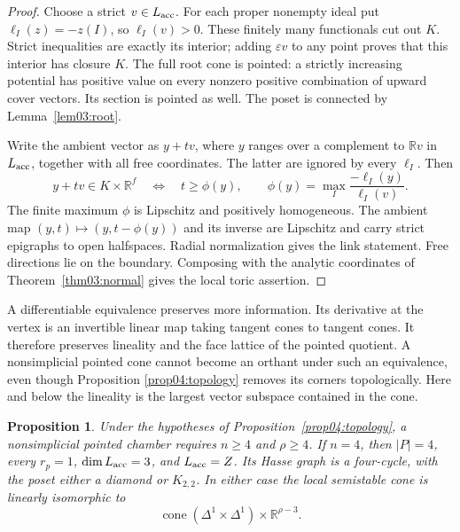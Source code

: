 \documentclass[11pt]{amsart}
\newtheorem{proposition}[theorem]{Proposition}
\theoremstyle{definition}
\theoremstyle{remark}
\newcommand{\RR}{\mathbb R}
\newcommand{\cone}{\operatorname{cone}}
\begin{document}
\begin{proof}
Choose a strict \(v\in L_{\rm acc}\). For each proper nonempty
ideal put \(\ell_I(z)=-z(I)\), so \(\ell_I(v)>0\).
These finitely many functionals cut out \(K\). Strict inequalities
are exactly its interior; adding \(\varepsilon v\) to any point
proves that this interior has closure \(K\). The full root cone is
pointed: a strictly increasing potential has positive value on every
nonzero positive combination of upward cover vectors. Its section is
pointed as well. The poset is connected by Lemma~\ref{lem03:root}.

Write the ambient vector as \(y+tv\), where \(y\) ranges over a
complement to \(\RR v\) in \(L_{\rm acc}\), together with all
free coordinates. The latter are ignored by every \(\ell_I\).
Then
\[
 y+tv\in K\times\RR^f
 \quad\Longleftrightarrow\quad
 t\ge\phi(y),\qquad
 \phi(y)=\max_I\frac{-\ell_I(y)}{\ell_I(v)}.
\]
The finite maximum \(\phi\) is Lipschitz and positively homogeneous.
The ambient map \((y,t)\mapsto(y,t-\phi(y))\) and its inverse
are Lipschitz and carry strict epigraphs to open halfspaces. Radial
normalization gives the link statement. Free directions lie on the
boundary. Composing with the analytic coordinates of
Theorem~\ref{thm03:normal} gives the local toric assertion.
\end{proof}

A differentiable equivalence preserves more information. Its derivative
at the vertex is an invertible linear map taking tangent cones to
tangent cones. It therefore preserves lineality and the face lattice
of the pointed quotient. A nonsimplicial pointed cone cannot become
an orthant under such an equivalence, even though Proposition
\ref{prop04:topology} removes its corners topologically. Here and below
the lineality is the largest vector subspace contained in the cone.

\begin{proposition}\label{prop04:dimension}
Under the hypotheses of Proposition~\ref{prop04:topology}, a
nonsimplicial pointed chamber requires \(n\ge4\) and \(\rho\ge4\).
If \(n=4\), then \(|P|=4\), every \(r_p=1\),
\(\dim L_{\rm acc}=3\), and \(L_{\rm acc}=Z\). Its Hasse graph
is a four-cycle, with the poset either a diamond or \(K_{2,2}\).
In either case the local semistable cone is linearly isomorphic to
\begin{equation}\label{eq04:square}
 \cone(\Delta^1\times\Delta^1)\times\RR^{\rho-3}.
\end{equation}
\end{proposition}
\end{document}
